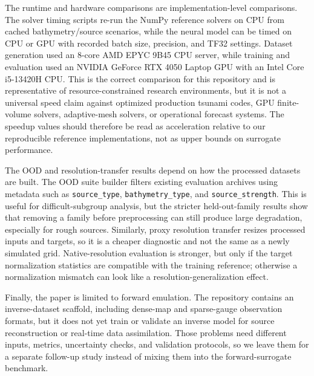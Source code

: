 The runtime and hardware comparisons are implementation-level comparisons. The solver timing scripts re-run the NumPy reference solvers on CPU from cached bathymetry/source scenarios, while the neural model can be timed on CPU or GPU with recorded batch size, precision, and TF32 settings. Dataset generation used an 8-core AMD EPYC 9B45 CPU server, while training and evaluation used an NVIDIA GeForce RTX 4050 Laptop GPU with an Intel Core i5-13420H CPU. This is the correct comparison for this repository and is representative of resource-constrained research environments, but it is not a universal speed claim against optimized production tsunami codes, GPU finite-volume solvers, adaptive-mesh solvers, or operational forecast systems. The speedup values should therefore be read as acceleration relative to our reproducible reference implementations, not as upper bounds on surrogate performance.

The OOD and resolution-transfer results depend on how the processed datasets are built. The OOD suite builder filters existing evaluation archives using metadata such as \texttt{source\_type}, \texttt{bathymetry\_type}, and \texttt{source\_strength}. This is useful for difficult-subgroup analysis, but the stricter held-out-family results show that removing a family before preprocessing can still produce large degradation, especially for rough sources. Similarly, proxy resolution transfer resizes processed inputs and targets, so it is a cheaper diagnostic and not the same as a newly simulated grid. Native-resolution evaluation is stronger, but only if the target normalization statistics are compatible with the training reference; otherwise a normalization mismatch can look like a resolution-generalization effect.

Finally, the paper is limited to forward emulation. The repository contains an inverse-dataset scaffold, including dense-map and sparse-gauge observation formats, but it does not yet train or validate an inverse model for source reconstruction or real-time data assimilation. Those problems need different inputs, metrics, uncertainty checks, and validation protocols, so we leave them for a separate follow-up study instead of mixing them into the forward-surrogate benchmark.
